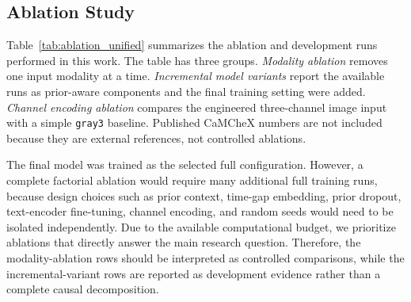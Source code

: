 \subsection{Ablation Study}
\label{subsec:results_ablation}

Table~\ref{tab:ablation_unified} summarizes the ablation and development runs performed in this work. The table has three groups. \emph{Modality ablation} removes one input modality at a time. \emph{Incremental model variants} report the available runs as prior-aware components and the final training setting were added. \emph{Channel encoding ablation} compares the engineered three-channel image input with a simple \texttt{gray3} baseline. Published CaMCheX numbers are not included because they are external references, not controlled ablations.

The final model was trained as the selected full configuration. However, a complete factorial ablation would require many additional full training runs, because design choices such as prior context, time-gap embedding, prior dropout, text-encoder fine-tuning, channel encoding, and random seeds would need to be isolated independently. Due to the available computational budget, we prioritize ablations that directly answer the main research question. Therefore, the modality-ablation rows should be interpreted as controlled comparisons, while the incremental-variant rows are reported as development evidence rather than a complete causal decomposition.

